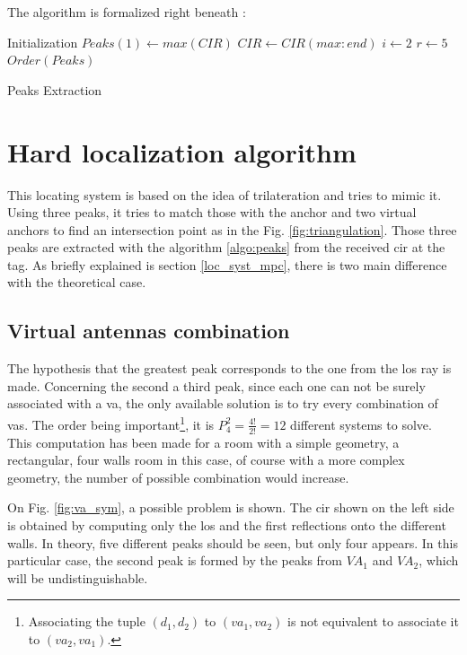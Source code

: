 The algorithm is formalized right beneath :
\vspace{2mm}

\begin{algorithm}[H]
Initialization\;
$Peaks(1) \longleftarrow max(CIR)$\;
$CIR \longleftarrow CIR(max:end)$\;
$i \longleftarrow 2$\;
$r \longleftarrow 5$\;
 $Order(Peaks)$
 \caption{Peaks Extraction \label{algo:peaks}}
\end{algorithm}

\section{Hard localization algorithm}
\label{hard_loc}
This locating system is based on the idea of trilateration and tries to mimic it. Using three peaks, it tries to match those with the anchor and two virtual anchors to find an intersection point as in the Fig. \ref{fig:triangulation}. Those three peaks are extracted with the algorithm \ref{algo:peaks} from the received \gls{cir} at the tag. As briefly explained is section \ref{loc_syst_mpc}, there is two main difference with the theoretical case.

\subsection{Virtual antennas combination}

The hypothesis that the greatest peak corresponds to the one from the \gls{los} ray is made. Concerning the second a third peak, since each one can not be surely associated with a \gls{va}, the only available solution is to try every combination of \glspl{va}. The order being important\footnote{Associating the tuple $(d_1, d_2)$ to $(va_1, va_2)$ is not equivalent to associate it to $(va_2, va_1)$.}, it is $P^2_4 = \frac{4!}{2!} = 12$ different systems to solve. This computation has been made for a room with a simple geometry, a rectangular, four walls room in this case, of course with a more complex geometry, the number of possible combination would increase.
\vspace{2mm}

On Fig. \ref{fig:va_sym}, a possible problem is shown. The \gls{cir} shown on the left side is obtained by computing only the \gls{los} and the first reflections onto the different walls. In theory, five different peaks should be seen, but only four appears. In this particular case, the second peak is formed by the peaks from $VA_1$ and $VA_2$, which will be undistinguishable.

